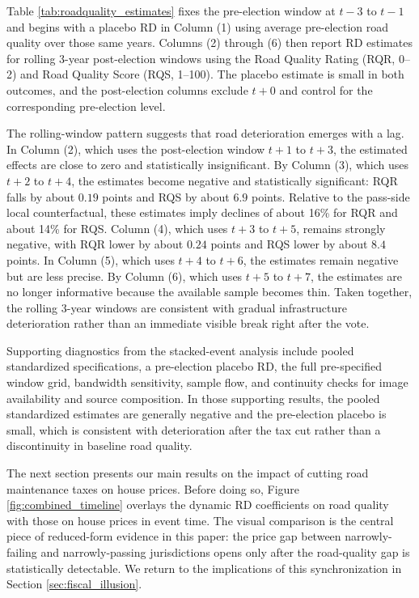 Table \ref{tab:roadquality_estimates} fixes the pre-election window at $t-3$ to $t-1$ and begins with a placebo RD in Column (1) using average pre-election road quality over those same years. Columns (2) through (6) then report RD estimates for rolling 3-year post-election windows using the Road Quality Rating (RQR, 0--2) and Road Quality Score (RQS, 1--100). The placebo estimate is small in both outcomes, and the post-election columns exclude $t+0$ and control for the corresponding pre-election level.

The rolling-window pattern suggests that road deterioration emerges with a lag. In Column (2), which uses the post-election window $t+1$ to $t+3$, the estimated effects are close to zero and statistically insignificant. By Column (3), which uses $t+2$ to $t+4$, the estimates become negative and statistically significant: RQR falls by about $0.19$ points and RQS by about $6.9$ points. Relative to the pass-side local counterfactual, these estimates imply declines of about 16\% for RQR and about 14\% for RQS. Column (4), which uses $t+3$ to $t+5$, remains strongly negative, with RQR lower by about $0.24$ points and RQS lower by about $8.4$ points. In Column (5), which uses $t+4$ to $t+6$, the estimates remain negative but are less precise. By Column (6), which uses $t+5$ to $t+7$, the estimates are no longer informative because the available sample becomes thin. Taken together, the rolling 3-year windows are consistent with gradual infrastructure deterioration rather than an immediate visible break right after the vote.

Supporting diagnostics from the stacked-event analysis include pooled standardized specifications, a pre-election placebo RD, the full pre-specified window grid, bandwidth sensitivity, sample flow, and continuity checks for image availability and source composition. In those supporting results, the pooled standardized estimates are generally negative and the pre-election placebo is small, which is consistent with deterioration after the tax cut rather than a discontinuity in baseline road quality.

The next section presents our main results on the impact of cutting road maintenance taxes on house prices. Before doing so, Figure \ref{fig:combined_timeline} overlays the dynamic RD coefficients on road quality with those on house prices in event time. The visual comparison is the central piece of reduced-form evidence in this paper: the price gap between narrowly-failing and narrowly-passing jurisdictions opens only after the road-quality gap is statistically detectable. We return to the implications of this synchronization in Section \ref{sec:fiscal_illusion}.

